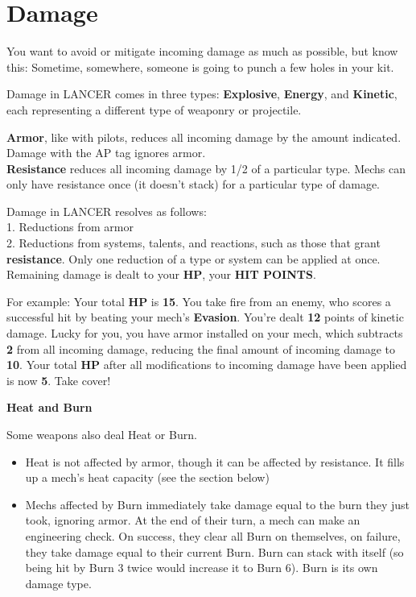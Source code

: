 \section{Damage}

You want to avoid or mitigate incoming damage as much as possible, but know this: Sometime, somewhere, someone is going to punch a few holes in your kit. 

Damage in LANCER comes in three types: \textbf{Explosive}, \textbf{Energy}, and \textbf{Kinetic}, each representing a different type of weaponry or projectile. 

\textbf{Armor}, like with pilots, reduces all incoming damage by the amount indicated. Damage with the AP tag ignores armor.\\
\textbf{Resistance} reduces all incoming damage by 1/2 of a particular type. Mechs can only have resistance once (it doesn’t stack) for a particular type of damage. 

Damage in LANCER resolves as follows:\\ 
1. Reductions from armor\\
2. Reductions from systems, talents, and reactions, such as those that grant \textbf{resistance}. Only one reduction of a type or system can be applied at once.\\
Remaining damage is dealt to your \textbf{HP}, your \textbf{HIT POINTS}. 

For example: Your total \textbf{HP} is  \textbf{15}. You take fire from an enemy, who scores a successful hit by beating your mech’s \textbf{Evasion}. You’re dealt \textbf{12} points of kinetic damage. Lucky for you, you have armor installed on your mech, which subtracts \textbf{2} from all incoming damage, reducing the final amount of incoming damage to  \textbf{10}. Your total \textbf{HP} after all modifications to incoming damage have been applied is now \textbf{5}. Take cover!

\begin{center}
  \textbf{Heat and Burn}
\end{center}

Some weapons also deal Heat or Burn.
\begin{itemize}
\item Heat is not affected by armor, though it can be affected by resistance. It fills up a mech’s heat capacity (see the section below) 
\item Mechs affected by Burn immediately take damage equal to the burn they just took, ignoring armor. At the end of their turn, a mech can make an engineering check. On success, they clear all Burn on themselves, on failure, they take damage equal to their current Burn. Burn can stack with itself (so being hit by Burn 3 twice would increase it to Burn 6). Burn is its own damage type.
\end{itemize}
  
